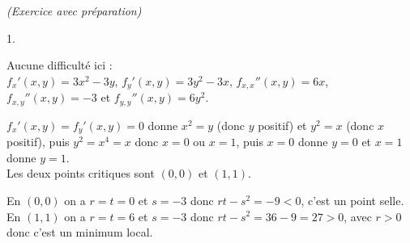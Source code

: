 \documentclass[11pt]{article}%
\begin{document}
\begin{exercice}{\it (Exercice avec préparation)}
\[\]
 \begin{noliste}{1.}
 \setlength{\itemsep}{4mm}
 \item Aucune difficulté ici : \\
 $f_{x}'(x,y) = 3 x^{2} - 3 y$, $f_{y}'(x,y) = 3 y^{2} - 3 x$,
$f_{x,x}''(x,y) = 6 x$, $f_{x,y}''(x,y) = -3$ et $f_{y,y}''(x,y) = 6
y^{2}$. \\
 \item $f_{x}'(x,y) = f_{y}'(x,y) = 0$ donne $x^{2} = y$ (donc $y$
positif) et $y^{2} = x$ (donc $x$ positif), puis $y^{2} = x^{4} = x$
donc $x = 0$ ou $x = 1$, puis $x = 0$ donne $y = 0$ et $x = 1$ donne $y
= 1$. \\
 Les deux points critiques sont $(0,0)$ et $(1,1)$. \\
 \item En $(0,0)$ on a $r = t = 0$ et $s = -3$ donc $rt - s^{2} = -9 <
0$, c'est un point selle. \\
 En $(1,1)$ on a $r = t = 6$ et $s = -3$ donc $rt-s^{2} = 36-9 = 27>0$,
avec $r>0$ donc c'est un minimum local.
 \end{noliste}
 \end{exercice}


 \newpage
\end{document}
